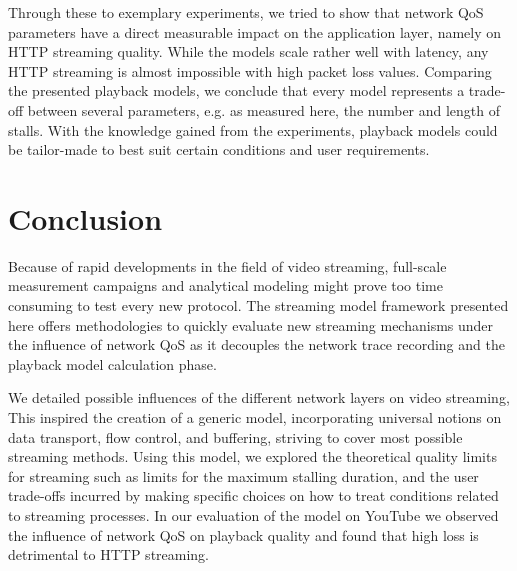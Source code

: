 Through these to exemplary experiments, we tried to show that network QoS parameters have a direct measurable impact on the application layer, namely on HTTP streaming quality. While the models scale rather well with latency, any HTTP streaming is almost impossible with high packet loss values.
Comparing the presented playback models, we conclude that every model represents a trade-off between several parameters, e.g. as measured here, the number and length of stalls. With the knowledge gained from the experiments, playback models could be tailor-made to best suit certain conditions and user requirements. 



	

\section{Conclusion}
\label{sec:conclusion-PV}


Because of rapid developments in the field of video streaming, full-scale measurement campaigns and analytical modeling might prove too time consuming to test every new protocol. The streaming model framework presented here offers methodologies to quickly evaluate new streaming mechanisms under the influence of network QoS as it decouples the network trace recording and the playback model calculation phase.

We detailed possible influences of the different network layers on video streaming, This inspired the creation of a generic model, incorporating universal notions on data transport, flow control, and buffering, striving to cover most possible streaming methods. Using this model, we explored the theoretical quality limits for streaming such as limits for the maximum stalling duration, and the user trade-offs incurred by making specific choices on how to treat conditions related to streaming processes. In our evaluation of the model on YouTube we observed the influence of network QoS on playback quality and found that high loss is detrimental to HTTP streaming.


